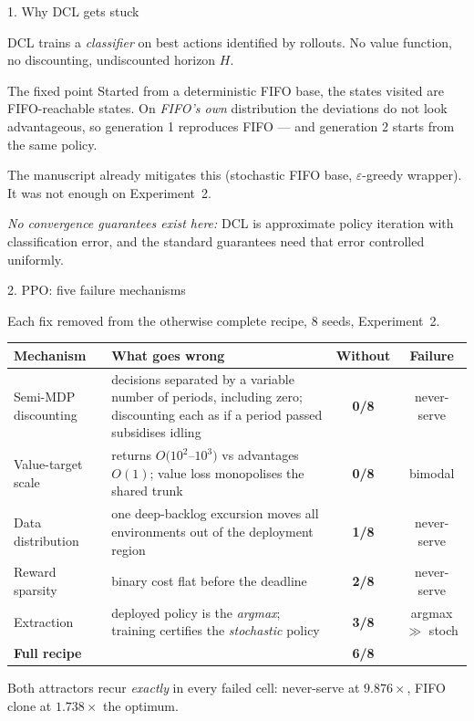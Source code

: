 \documentclass[11pt,aspectratio=169]{beamer}
\newcommand{\good}[1]{\textbf{#1}}
\begin{document}
\begin{frame}{1. Why DCL gets stuck}

DCL trains a \emph{classifier} on best actions identified by rollouts.  No value
function, no discounting, undiscounted horizon $H$.

\vfill
\begin{block}{The fixed point}
Started from a deterministic FIFO base, the states visited are FIFO-reachable
states.  On \emph{FIFO's own} distribution the deviations do not look
advantageous, so generation 1 reproduces FIFO --- and generation 2 starts from
the same policy.
\end{block}

\vfill
The manuscript already mitigates this (stochastic FIFO base, $\varepsilon$-greedy
wrapper).  It was not enough on Experiment~2.

\vfill
\emph{No convergence guarantees exist here:} DCL is approximate policy iteration
with classification error, and the standard guarantees need that error
controlled uniformly.

\end{frame}

\begin{frame}{2. PPO: five failure mechanisms}

Each fix removed from the otherwise complete recipe, 8 seeds, Experiment~2.

\begin{center}
\small
\begin{tabular}{p{3.4cm}p{5.4cm}cc}
\toprule
\textbf{Mechanism} & \textbf{What goes wrong} & \textbf{Without} & \textbf{Failure} \\
\midrule
Semi-MDP discounting & decisions separated by a variable number of periods,
including zero; discounting each as if a period passed subsidises idling
& \good{0/8} & never-serve \\[2pt]
Value-target scale & returns $O(10^2$--$10^3)$ vs advantages $O(1)$; value loss
monopolises the shared trunk & \good{0/8} & bimodal \\[2pt]
Data distribution & one deep-backlog excursion moves all environments out of
the deployment region & \good{1/8} & never-serve \\[2pt]
Reward sparsity & binary cost flat before the deadline & \good{2/8} & never-serve \\[2pt]
Extraction & deployed policy is the \emph{argmax}; training certifies the
\emph{stochastic} policy & \good{3/8} & argmax $\gg$ stoch \\
\midrule
\textbf{Full recipe} & & \good{6/8} & \\
\bottomrule
\end{tabular}
\end{center}

\vfill
\small
Both attractors recur \emph{exactly} in every failed cell: never-serve at
$9.876\times$, FIFO clone at $1.738\times$ the optimum.

\end{frame}
\end{document}
